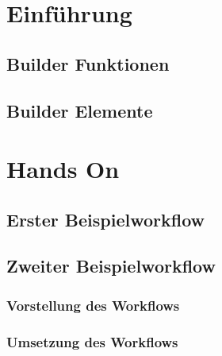 \section{Einführung}

\subsection{Builder Funktionen}
\label{sec:builder-funktionen}

\subsection{Builder Elemente}
\label{sec:builder-elemente}

\section{Hands On}

\subsection{Erster Beispielworkflow}
\label{sec:builder-1-bsp}

\subsection{Zweiter Beispielworkflow}
\label{sec:builder-2-bsp}
%

\subsubsection{Vorstellung des Workflows}
\label{sec:builder-2-bsp-vorstellung}

\subsubsection{Umsetzung des Workflows}
\label{sec:builder-2-bsp-umsetzung}

